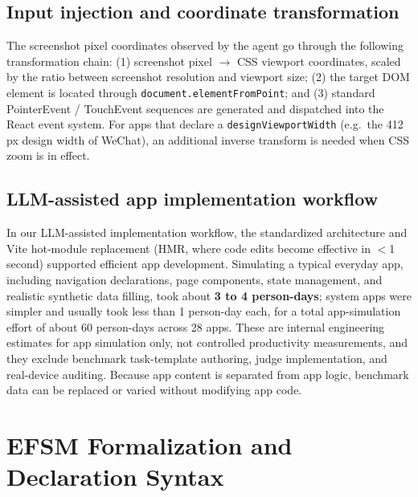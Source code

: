 \documentclass{llmxive}
\begin{document}
\subsection{Input injection and coordinate transformation}

The screenshot pixel coordinates observed by the agent go through the following transformation chain: (1) screenshot pixel $\to$ CSS viewport coordinates, scaled by the ratio between screenshot resolution and viewport size; (2) the target DOM element is located through \texttt{document.elementFromPoint}; and (3) standard PointerEvent / TouchEvent sequences are generated and dispatched into the React event system. For apps that declare a \texttt{designViewportWidth} (e.g.\ the 412\,px design width of WeChat), an additional inverse transform is needed when CSS zoom is in effect.

\subsection{LLM-assisted app implementation workflow}

In our LLM-assisted implementation workflow, the standardized architecture and Vite hot-module replacement (HMR, where code edits become effective in $<$1 second) supported efficient app development. Simulating a typical everyday app, including navigation declarations, page components, state management, and realistic synthetic data filling, took about \textbf{3 to 4 person-days}; system apps were simpler and usually took less than 1 person-day each, for a total app-simulation effort of about 60 person-days across 28 apps. These are internal engineering estimates for app simulation only, not controlled productivity measurements, and they exclude benchmark task-template authoring, judge implementation, and real-device auditing. Because app content is separated from app logic, benchmark data can be replaced or varied without modifying app code.


\section{EFSM Formalization and Declaration Syntax}\label{app:efsm}
\end{document}
